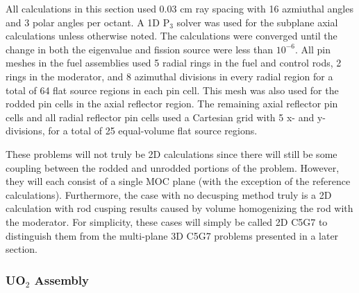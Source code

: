 All calculations in this section used 0.03 cm ray spacing with 16 azmiuthal angles and 3 polar angles per octant.  A 1D P$_3$ solver was used for the subplane axial calculations unless otherwise noted.  The calculations were converged until the change in both the eigenvalue and fission source were less than $10^{-6}$.  All pin meshes in the fuel assemblies used 5 radial rings in the fuel and control rods, 2 rings in the moderator, and 8 azimuthal divisions in every radial region for a total of 64 flat source regions in each pin cell.  This mesh was also used for the rodded pin cells in the axial reflector region.  The remaining axial reflector pin cells and all radial reflector pin cells used a Cartesian grid with 5 x- and y- divisions, for a total of 25 equal-volume flat source regions.

These problems will not truly be 2D calculations since there will still be some coupling between the rodded and unrodded portions of the problem.  However, they will each consist of a single MOC plane (with the exception of the reference calculations).  Furthermore, the case with no decusping method truly is a 2D calculation with rod cusping results caused by volume homogenizing the rod with the moderator.  For simplicity, these cases will simply be called 2D C5G7 to distinguish them from the multi-plane 3D C5G7 problems presented in a later section.

\subsubsection{UO\texorpdfstring{$_2$}{2} Assembly}\label{sss:results-2d-assem}

